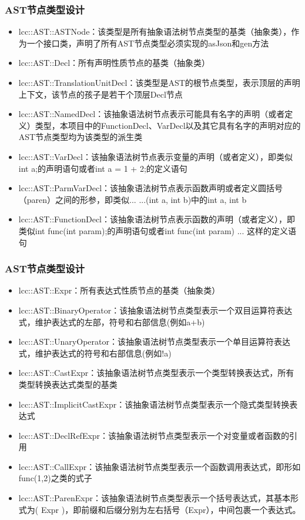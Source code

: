 \begin{frame}
    \frametitle{AST节点类型设计}
    \footnotesize
    \begin{itemize}
        \item {lcc::AST::ASTNode：该类型是所有抽象语法树节点类型的基类（抽象类），作为一个接口类，声明了所有AST节点类型必须实现的asJson和gen方法}
        \item {lcc::AST::Decl：所有声明性质节点的基类（抽象类）}
        \item {lcc::AST::TranslationUnitDecl：该类型是AST的根节点类型，表示顶层的声明上下文，该节点的孩子是若干个顶层Decl节点}
        \item {lcc::AST::NamedDecl：该抽象语法树节点表示可能具有名字的声明（或者定义）类型，本项目中的FunctionDecl、VarDecl以及其它具有名字的声明对应的AST节点类型均为该类型的派生类}
        \item {lcc::AST::VarDecl：该抽象语法树节点表示变量的声明（或者定义），即类似int a;的声明语句或者int a = 1 + 2;的定义语句}
        \item {lcc::AST::ParmVarDecl：该抽象语法树节点表示函数声明或者定义圆括号（paren）之间的形参，即类似... ...(int a, int b)中的int a, int b}
        \item {lcc::AST::FunctionDecl：该抽象语法树节点表示函数的声明（或者定义），即类似int func(int param);的声明语句或者int func(int param){ ... }这样的定义语句}
    \end{itemize}
\end{frame}

\begin{frame}
    \frametitle{AST节点类型设计}
    \footnotesize
    \begin{itemize}
        \item {lcc::AST::Expr：所有表达式性质节点的基类（抽象类）}
        \item {lcc::AST::BinaryOperator：该抽象语法树节点类型表示一个双目运算符表达式，维护表达式的左部，符号和右部信息(例如a+b)}
        \item {lcc::AST::UnaryOperator：该抽象语法树节点类型表示一个单目运算符表达式，维护表达式的符号和右部信息(例如!a)}
        \item {lcc::AST::CastExpr：该抽象语法树节点类型表示一个类型转换表达式，所有类型转换表达式类型的基类}
        \item {lcc::AST::ImplicitCastExpr：该抽象语法树节点类型表示一个隐式类型转换表达式}
        \item {lcc::AST::DeclRefExpr：该抽象语法树节点类型表示一个对变量或者函数的引用}
        \item {lcc::AST::CallExpr：该抽象语法树节点类型表示一个函数调用表达式，即形如func(1,2)之类的式子}
        \item {lcc::AST::ParenExpr：该抽象语法树节点类型表示一个括号表达式，其基本形式为( Expr )，即前缀和后缀分别为左右括号（Expr），中间包裹一个表达式。}
    \end{itemize}
\end{frame}

